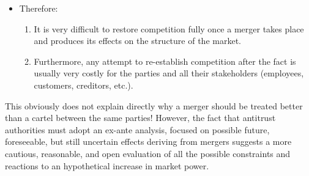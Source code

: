 \begin{enumerate}
            \begin{itemize}
                \item Therefore:
                \begin{enumerate}[label=(\alph*)]
                    \item It is very difficult to restore competition fully once a merger takes place and produces its effects on the structure of the market.
                    \item Furthermore, any attempt to re-establish competition after the fact is usually very costly for the parties and all their stakeholders (employees, customers, creditors, etc.).
                \end{enumerate}
            \end{itemize}
            This obviously does not explain directly why a merger should be treated better than a cartel between the same parties!
            However, the fact that antitrust authorities must adopt an ex-ante analysis, focused on possible future, foreseeable, but still uncertain effects deriving from mergers suggests a more cautious, reasonable, and open evaluation of all the possible constraints and reactions to an hypothetical increase in market power.
        \end{enumerate}   

\newpage

